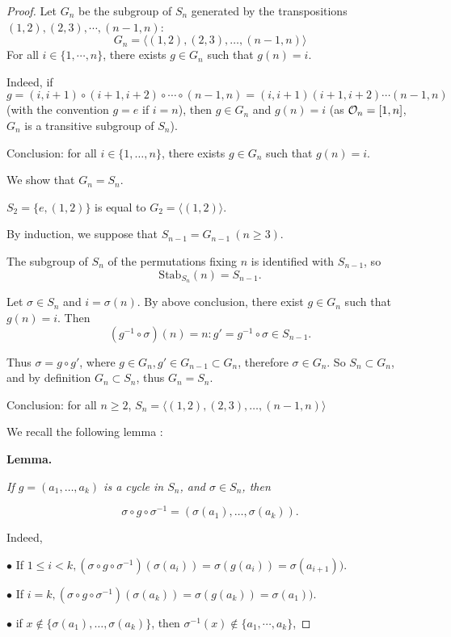 \documentclass[11pt,a4paper]{article}
\begin{document}
\begin{proof}
Let $G_n$  be the subgroup of $S_n$ generated by the transpositions $(1,2),(2,3),\cdots,{(n-1,n)}$:
$$G_n=\langle (1,2), (2,3),\ldots,(n-1,n) \rangle$$
 For all $i\in \{1,\cdots,n\}$, there exists $g\in G_n$ such that $g(n) = i$.

Indeed, if  $g = (i,i+1) \circ (i+1,i+2)\circ \cdots \circ (n-1,n)  =  (i,i+1) (i+1,i+2)\cdots (n-1,n)$  (with the convention $g=e$ if $i=n$), then  $g \in G_n$ and $g(n) = i$
(as ${\cal O}_n = [1,n]$, $G_n$ is a transitive subgroup of $S_n$).

Conclusion: for all $i \in \{1,\ldots,n\}$, there exists $g \in G_n$ such that $g(n) = i$.

\bigskip

We show that $G_n = S_n$.

$S_2 = \{e,(1,2)\}$ is equal to  $G_2=\langle (1,2) \rangle$.

By induction, we suppose that $S_{n-1} = G_{n-1}\ (n\geq 3)$.

The subgroup of  $S_n$ of the permutations fixing $n$ is identified with $S_{n-1}$, so
$$\mathrm{Stab}_{S_n}(n) = S_{n-1}.$$

Let $\sigma \in S_n$ and $i = \sigma(n)$.
By above conclusion, there exist $g \in G_n$ such that $g(n) = i$. 
Then $$(g^{-1} \circ \sigma)(n) = n :  g' = g^{-1} \circ \sigma \in S_{n-1}.$$

Thus $\sigma = g \circ g'$, where $g \in G_n, g' \in G_{n-1} \subset G_n$, therefore $\sigma \in G_n$.
So $S_n \subset G_n$, and by definition $G_n \subset S_n$, thus $G_n = S_n$.

Conclusion: for all $n\geq 2$, $S_n = \langle (1,2), (2,3),\ldots,(n-1,n) \rangle$

\bigskip

We recall the following lemma :

{\bf Lemma. }{\it If $g=(a_1,\ldots,a_k)$ is a cycle in $S_n$, and $\sigma \in S_n$, then

$$\sigma \circ g \circ \sigma^{-1} = (\sigma(a_1),\ldots, \sigma(a_k)).$$}

Indeed,

$\bullet$ If $1 \leq i <k, (\sigma \circ g \circ \sigma^{-1})(\sigma(a_i)) = \sigma(g(a_i)) = \sigma(a_{i+1}))$.

$\bullet$ If $i = k, (\sigma \circ g \circ \sigma^{-1})(\sigma(a_k)) = \sigma(g(a_k)) = \sigma(a_1))$.

$\bullet$ if $x \not \in \{\sigma(a_1),\ldots,\sigma(a_k)\}$, then $\sigma^{-1}(x) \not \in \{a_1,\cdots,a_k\}$,


\end{proof}
\end{document}
